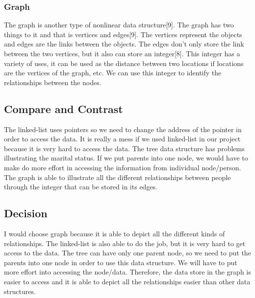 \documentclass[onecolumn, draftclsnofoot,10pt, compsoc]{IEEEtran}
\begin{document}
\subsubsection{Graph}
\begin{singlespace}
The graph is another type of nonlinear data structure[9]. The graph has two things to it and that is vertices and edges[9]. The vertices represent the objects and edges are the links between the objects. The edges don't only store the link between the two vertices, but it also can store an integer[8]. This integer has a variety of uses, it can be used as the distance between two locations if locations are the vertices of the graph, etc. We can use this integer to identify the relationships between the nodes.
\end{singlespace}

\subsection{Compare and Contrast}
\begin{singlespace}
The linked-list uses pointers so we need to change the address of the pointer in order to access the data. It is really a mess if we used linked-list in our project because it is very hard to access the data. The tree data structure has problems illustrating the marital status. If we put parents into one node, we would have to make do more effort in accessing the information from individual node/person. The graph is able to illustrate all the different relationships between people through the integer that can be stored in its edges. 
\end{singlespace}

\subsection{Decision}
\begin{singlespace}
I would choose graph because it is able to depict all the different kinds of relationships. The linked-list is also able to do the job, but it is very hard to get access to the data. The tree can have only one parent node, so we need to put the parents into one node in order to use this data structure. We will have to put more effort into accessing the node/data. Therefore, the data store in the graph is easier to access and it is able to depict all the relationships easier than other data structures.   
\end{singlespace}
\end{document}
